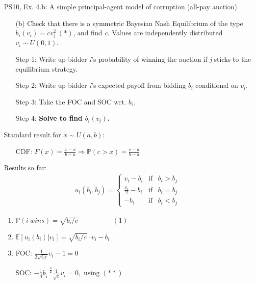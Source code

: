 \begin{frame}{PS10, Ex. 4.b: A simple principal-agent model of corruption (all-pay auction)}
    \begin{itemize}
      \item[(b)] Check that there is a symmetric Bayesian Nash Equilibrium of the type $b_i(v_i) = cv_i^2\ (*)$, and find \textit{c}. Values are independently distributed $v_i\sim U(0, 1)$.
    \end{itemize} \vspace{-8pt}
    \begin{multicols}{2}
      \begin{itemize}
        \item[Step 1:] Write up bidder \textit{i}'s probability of winning the auction if \textit{j} sticks to the equilibrium strategy.
        \item[Step 2:] Write up bidder \textit{i}'s expected payoff from bidding $b_i$ conditional on $v_i$.
        \item[Step 3:] Take the FOC and SOC wrt. $b_i$.
        \item[Step 4:] \textbf{Solve to find $b_i(v_i)$.}
      \end{itemize} \vspace{-8pt}
      \vfill\null\columnbreak
      Standard result for $x\sim U(a, b):$ \vspace{-6pt}
      \begin{itemize}
        \item[CDF:] $F(x)=\frac{x-a}{b-a}\Rightarrow\mathbb{P}(c>x)=\frac{c-a}{b-a}$
      \end{itemize}
      \vspace{-6pt}
      Results so far: \vspace{-6pt}
      \begin{align*}
        u_i(b_i,b_j)=\left\{\begin{array}{lcl}
          v_i-b_i           & \text{if} & b_i>b_j \\
          \frac{v_i}{2}-b_i & \text{if} & b_i=b_j \\
          -b_i              & \text{if} & b_i<b_j
        \end{array}\right.
      \end{align*} \vspace{-16pt}
      \begin{enumerate}
        \item $\mathbb{P}(i\ wins)=\sqrt{b_i/c}\quad\quad\quad\quad\quad(1)$
        \item $\mathbb{E}[u_i(b_i)|v_i]=\sqrt{b_i/c}\cdot v_i-b_i$
        \item FOC: $\frac{1}{2\sqrt{b_ic}}v_i-1=0$
        \item[] SOC: $-\frac{1}{4}b_i^{-\frac{3}{2}}\frac{1}{\sqrt{c}}v_i=0,\text{ using }(**)$
      \end{enumerate}
      \vfill\null
    \end{multicols}
\end{frame}
